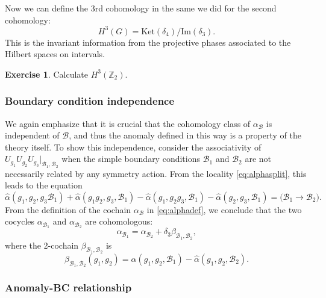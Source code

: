 \documentclass[
]{scrartcl}
\numberwithin{equation}{section}
\theoremstyle{definition}
\theoremstyle{definition}
\theoremstyle{definition}
\newtheorem{exercise}{Exercise}[section]
\theoremstyle{definition}
\theoremstyle{remark}
\begin{document}
Now we can define the 3rd cohomology in the same we did for the second cohomology:
\begin{equation}
    \label{eq:H3g}
    H^3(G) = \mathrm{Ket}(\delta_4)/\mathrm{Im}(\delta_3).
\end{equation}
This is the invariant information from the projective phases associated to the Hilbert spaces on intervals.

\begin{exercise}
Calculate \(H^3(\mathbb{Z}_2)\).
\end{exercise}

\hypertarget{boundary-condition-independence}{%
\subsubsection{Boundary condition independence}\label{boundary-condition-independence}}

We again emphasize that it is crucial that the cohomology class of \(\alpha_{\mathcal{B}}\) is independent of \(\mathcal{B}\), and thus the anomaly defined in this way is a property of the theory itself.
To show this independence, consider the associativity of
\(U_{g_1}U_{g_2}U_{g_3}|_{\mathcal{B}_1,\mathcal{B}_2}\) when the simple boundary conditions \(\mathcal{B}_1\) and \(\mathcal{B}_2\) are not necessarily related by any symmetry action.
From the locality \eqref{eq:alphasplit}, this leads to the equation
\begin{equation}
    \label{eq:assocB1B2}
    \hat\alpha(g_1,g_2,g_3\mathcal{B}_1) + \hat\alpha(g_1g_2,g_3,\mathcal{B}_1) - \hat\alpha(g_1,g_2g_3,\mathcal{B}_1) - \hat\alpha(g_2,g_3,\mathcal{B}_1) = \text{($\mathcal{B}_1 \to \mathcal{B}_2$)}.
\end{equation}
From the definition of the cochain \(\alpha_{\mathcal{B}}\) in \eqref{eq:alphadef}, we conclude that the two cocycles \(\alpha_{\mathcal{B}_1}\) and \(\alpha_{\mathcal{B}_2}\) are cohomologous:
\begin{equation}
    \label{eq:B1B2equiv}
    \alpha_{\mathcal{B}_1} = \alpha_{\mathcal{B}_2} + \delta_3 \beta_{\mathcal{B}_1,\mathcal{B}_2},
\end{equation}
where the 2-cochain \(\beta_{\mathcal{B}_1,\mathcal{B}_2}\) is
\begin{equation}
    \label{eq:betaB1B2}
    \beta_{\mathcal{B}_1,\mathcal{B}_2}(g_1,g_2) = \hat\alpha(g_1,g_2,\mathcal{B}_1) - \hat\alpha(g_1,g_2,\mathcal{B}_2).
\end{equation}

\hypertarget{anomaly-bc-relationship}{%
\subsubsection{Anomaly-BC relationship}\label{anomaly-bc-relationship}}
\end{document}
